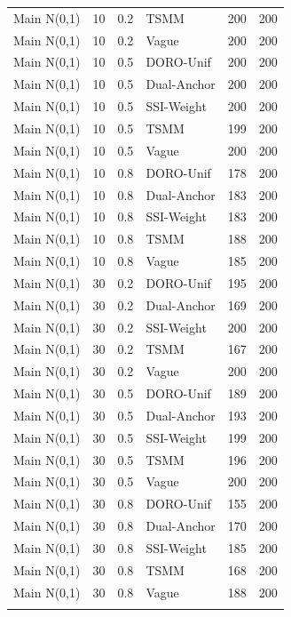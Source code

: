 \begin{longtable}{llllll}
Main N(0,1) & 10 & 0.2 & TSMM & 200 & 200 \\ \addlinespace[3pt]
Main N(0,1) & 10 & 0.2 & Vague & 200 & 200 \\ \addlinespace[3pt]
Main N(0,1) & 10 & 0.5 & DORO-Unif & 200 & 200 \\ \addlinespace[3pt]
Main N(0,1) & 10 & 0.5 & Dual-Anchor & 200 & 200 \\ \addlinespace[3pt]
Main N(0,1) & 10 & 0.5 & SSI-Weight & 200 & 200 \\ \addlinespace[3pt]
Main N(0,1) & 10 & 0.5 & TSMM & 199 & 200 \\ \addlinespace[3pt]
Main N(0,1) & 10 & 0.5 & Vague & 200 & 200 \\ \addlinespace[3pt]
Main N(0,1) & 10 & 0.8 & DORO-Unif & 178 & 200 \\ \addlinespace[3pt]
Main N(0,1) & 10 & 0.8 & Dual-Anchor & 183 & 200 \\ \addlinespace[3pt]
Main N(0,1) & 10 & 0.8 & SSI-Weight & 183 & 200 \\ \addlinespace[3pt]
Main N(0,1) & 10 & 0.8 & TSMM & 188 & 200 \\ \addlinespace[3pt]
Main N(0,1) & 10 & 0.8 & Vague & 185 & 200 \\ \addlinespace[3pt]
Main N(0,1) & 30 & 0.2 & DORO-Unif & 195 & 200 \\ \addlinespace[3pt]
Main N(0,1) & 30 & 0.2 & Dual-Anchor & 169 & 200 \\ \addlinespace[3pt]
Main N(0,1) & 30 & 0.2 & SSI-Weight & 200 & 200 \\ \addlinespace[3pt]
Main N(0,1) & 30 & 0.2 & TSMM & 167 & 200 \\ \addlinespace[3pt]
Main N(0,1) & 30 & 0.2 & Vague & 200 & 200 \\ \addlinespace[3pt]
Main N(0,1) & 30 & 0.5 & DORO-Unif & 189 & 200 \\ \addlinespace[3pt]
Main N(0,1) & 30 & 0.5 & Dual-Anchor & 193 & 200 \\ \addlinespace[3pt]
Main N(0,1) & 30 & 0.5 & SSI-Weight & 199 & 200 \\ \addlinespace[3pt]
Main N(0,1) & 30 & 0.5 & TSMM & 196 & 200 \\ \addlinespace[3pt]
Main N(0,1) & 30 & 0.5 & Vague & 200 & 200 \\ \addlinespace[3pt]
Main N(0,1) & 30 & 0.8 & DORO-Unif & 155 & 200 \\ \addlinespace[3pt]
Main N(0,1) & 30 & 0.8 & Dual-Anchor & 170 & 200 \\ \addlinespace[3pt]
Main N(0,1) & 30 & 0.8 & SSI-Weight & 185 & 200 \\ \addlinespace[3pt]
Main N(0,1) & 30 & 0.8 & TSMM & 168 & 200 \\ \addlinespace[3pt]
Main N(0,1) & 30 & 0.8 & Vague & 188 & 200 \\ \addlinespace[3pt]
\bottomrule\end{longtable}
